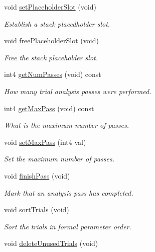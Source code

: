 \begin{DoxyCompactItemize}
void \mbox{\hyperlink{class_param_active_ad5e20b21265e1788deb66b2f30b3b55b}{set\+Placeholder\+Slot}} (void)
\begin{DoxyCompactList}\small\item\em Establish a stack placedholder slot. \end{DoxyCompactList}\item 
void \mbox{\hyperlink{class_param_active_a42ec2498ce1d913aaed22b67b479d6e5}{free\+Placeholder\+Slot}} (void)
\begin{DoxyCompactList}\small\item\em Free the stack placeholder slot. \end{DoxyCompactList}\item 
int4 \mbox{\hyperlink{class_param_active_af2221b328688426d4a192c0704ed787e}{get\+Num\+Passes}} (void) const
\begin{DoxyCompactList}\small\item\em How many trial analysis passes were performed. \end{DoxyCompactList}\item 
int4 \mbox{\hyperlink{class_param_active_a3d3a20decd7830cd778d890f6a41e83b}{get\+Max\+Pass}} (void) const
\begin{DoxyCompactList}\small\item\em What is the maximum number of passes. \end{DoxyCompactList}\item 
void \mbox{\hyperlink{class_param_active_ad4a9012547b34e47de3645ad5e062f4f}{set\+Max\+Pass}} (int4 val)
\begin{DoxyCompactList}\small\item\em Set the maximum number of passes. \end{DoxyCompactList}\item 
void \mbox{\hyperlink{class_param_active_a0cc6c52ae0d0c76d38fb603a10a7b53e}{finish\+Pass}} (void)
\begin{DoxyCompactList}\small\item\em Mark that an analysis pass has completed. \end{DoxyCompactList}\item 
void \mbox{\hyperlink{class_param_active_ac0e9c62853e05738a55adfec7f626726}{sort\+Trials}} (void)
\begin{DoxyCompactList}\small\item\em Sort the trials in formal parameter order. \end{DoxyCompactList}\item 
void \mbox{\hyperlink{class_param_active_a23ffb29ecb4569901e136929a50ac6b2}{delete\+Unused\+Trials}} (void)

\end{DoxyCompactItemize}
